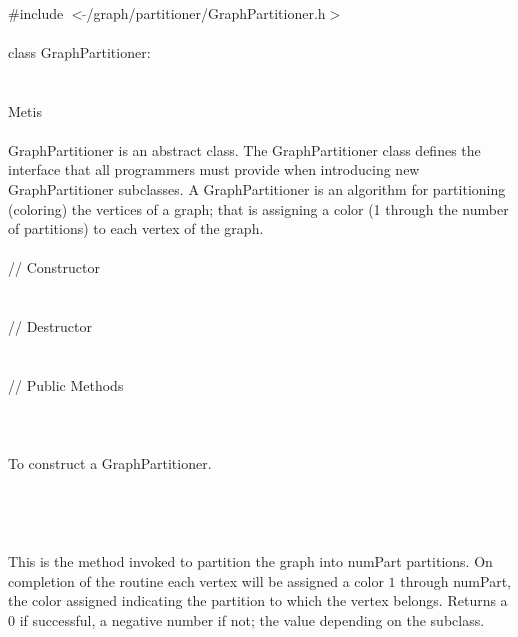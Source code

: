 
   \\
\indent \#include $<\tilde{ }$/graph/partitioner/GraphPartitioner.h$>$  \\

  \\
\indent class GraphPartitioner:  \\

 \\
 \\
\indent\indent Metis \\

  \\
\indent GraphPartitioner is an abstract class. The GraphPartitioner
class defines the interface that all programmers must provide when
introducing new GraphPartitioner subclasses. A GraphPartitioner is an
algorithm for partitioning (coloring) the vertices of a graph; that is
assigning a color (1 through the number of partitions) to each vertex
of the graph. \\

  \\
\indent\indent // Constructor \\
\indent{}  \\ \\
\indent\indent // Destructor  \\
\indent{}  \\ \\
\indent\indent // Public Methods  \\
\indent{} \\

  \\
  \\
To construct a GraphPartitioner. \\

  \\
  \\

  \\
 \\
This is the method invoked to partition the graph into \p numPart
partitions. On completion of the routine each vertex will be assigned
a color $1$ through \p numPart, the color assigned indicating the
partition to which the vertex belongs. Returns a $0$ if successful, a
negative number if not; the value depending on the subclass.  \\



